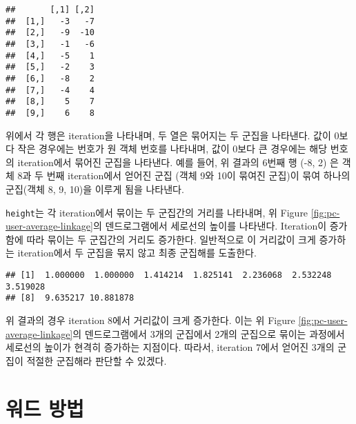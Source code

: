 \documentclass[
]{book}
\newenvironment{Shaded}{\begin{snugshade}}{\end{snugshade}}
\newcommand{\NormalTok}[1]{#1}
\newcommand{\SpecialCharTok}[1]{\textcolor[rgb]{0.00,0.00,0.00}{#1}}
\begin{document}
\begin{Shaded}
\end{Shaded}

\begin{verbatim}
##       [,1] [,2]
##  [1,]   -3   -7
##  [2,]   -9  -10
##  [3,]   -1   -6
##  [4,]   -5    1
##  [5,]   -2    3
##  [6,]   -8    2
##  [7,]   -4    4
##  [8,]    5    7
##  [9,]    6    8
\end{verbatim}

위에서 각 행은 iteration을 나타내며, 두 열은 묶어지는 두 군집을 나타낸다. 값이 0보다 작은 경우에는 번호가 원 객체 번호를 나타내며, 값이 0보다 큰 경우에는 해당 번호의 iteration에서 묶어진 군집을 나타낸다. 예를 들어, 위 결과의 6번째 행 (-8, 2) 은 객체 8과 두 번째 iteration에서 얻어진 군집 (객체 9와 10이 묶여진 군집)이 묶여 하나의 군집(객체 8, 9, 10)을 이루게 됨을 나타낸다.

\texttt{height}는 각 iteration에서 묶이는 두 군집간의 거리를 나타내며, 위 Figure \ref{fig:pc-user-average-linkage}의 덴드로그램에서 세로선의 높이를 나타낸다. Iteration이 증가함에 따라 묶이는 두 군집간의 거리도 증가한다. 일반적으로 이 거리값이 크게 증가하는 iteration에서 두 군집을 묶지 않고 최종 군집해를 도출한다.

\begin{Shaded}
\end{Shaded}

\begin{verbatim}
## [1]  1.000000  1.000000  1.414214  1.825141  2.236068  2.532248  3.519028
## [8]  9.635217 10.881878
\end{verbatim}

위 결과의 경우 iteration 8에서 거리값이 크게 증가한다. 이는 위 Figure \ref{fig:pc-user-average-linkage}의 덴드로그램에서 3개의 군집에서 2개의 군집으로 묶이는 과정에서 세로선의 높이가 현격히 증가하는 지점이다. 따라서, iteration 7에서 얻어진 3개의 군집이 적절한 군집해라 판단할 수 있겠다.

\hypertarget{ward-method}{%
\section{워드 방법}\label{ward-method}}
\end{document}

